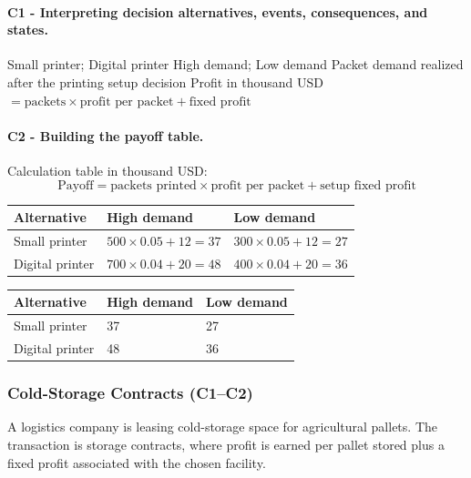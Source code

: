	\paragraph*{C1 - Interpreting decision alternatives, events, consequences, and states.}
	\label{subsec:problem16-local-printing-contracts-c1}
	\DecisionElementsTable
	{Small printer; Digital printer}
	{High demand; Low demand}
	{Packet demand realized after the printing setup decision}
	{Profit in thousand USD $= \text{packets} \times \text{profit per packet} + \text{fixed profit}$}


	\paragraph*{C2 - Building the payoff table.}
	\label{subsec:problem16-local-printing-contracts-c2}
	Calculation table in thousand USD:
	\[
	\text{Payoff}=\text{packets printed}\times\text{profit per packet}+\text{setup fixed profit}
	\]
	\begin{center}
		\begin{tabular}{lll}
			\toprule
			Alternative & High demand & Low demand \\
			\midrule
			Small printer & $500 \times 0.05 + 12 = 37$ & $300 \times 0.05 + 12 = 27$ \\
			Digital printer & $700 \times 0.04 + 20 = 48$ & $400 \times 0.04 + 20 = 36$ \\
			\bottomrule
		\end{tabular}
	\end{center}

	\begin{center}
		\begin{tabular}{lll}
			\toprule
			Alternative & High demand & Low demand \\
			\midrule
			Small printer & 37 & 27 \\
			Digital printer & 48 & 36 \\
			\bottomrule
		\end{tabular}
	\end{center}


	\subsubsection{Cold-Storage Contracts (C1--C2)}
	\label{sec:problem17-cold-storage-contracts-c1-c2}
	A logistics company is leasing cold-storage space for agricultural pallets. The transaction is storage contracts, where profit is earned per pallet stored plus a fixed profit associated with the chosen facility.

